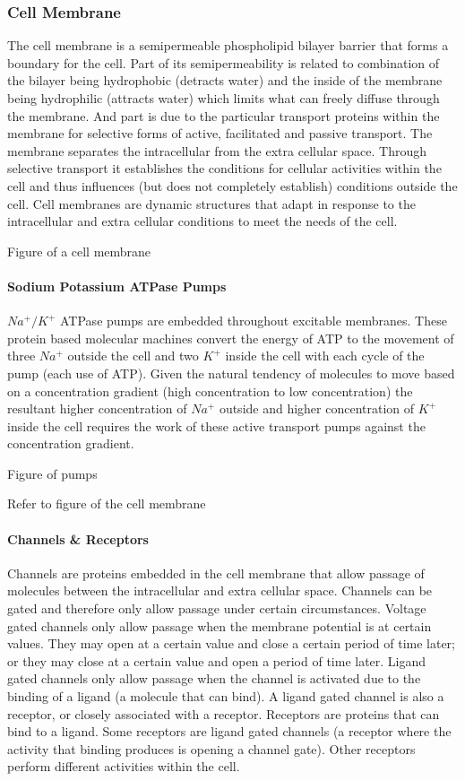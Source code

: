 \subsubsection{Cell Membrane}

The cell membrane is a semipermeable phospholipid bilayer barrier that forms a boundary for the cell. Part of its semipermeability is related to combination of the bilayer being hydrophobic (detracts water) and the inside of the membrane being hydrophilic (attracts water) which limits what can freely diffuse through the membrane. And part is due to the particular transport proteins within the membrane for selective forms of active, facilitated and passive transport. The membrane separates the intracellular from the extra cellular space. Through selective transport it establishes the conditions for cellular activities within the cell and thus influences (but does not completely establish) conditions outside the cell. Cell membranes are dynamic structures that adapt in response to the intracellular and extra cellular conditions to meet the needs of the cell.

Figure of a cell membrane

\paragraph{Sodium Potassium ATPase Pumps}
$Na^+/K^+$ ATPase pumps are embedded throughout excitable membranes. These protein based molecular machines convert the energy of ATP to the movement of three $Na^+$ outside the cell and two $K^+$ inside the cell with each cycle of the pump (each use of ATP). Given the natural tendency of molecules to move based on a concentration gradient (high concentration to low concentration) the resultant higher concentration of  $Na^+$ outside and higher concentration of $K^+$ inside the cell requires the work of these active transport pumps against the concentration gradient.

Figure of pumps

Refer to figure of the cell membrane 

\paragraph{Channels \& Receptors}
Channels are proteins embedded in the cell membrane that allow passage of molecules between the intracellular and extra cellular space. Channels can be gated and therefore only allow passage under certain circumstances. 
Voltage gated channels only allow passage when the membrane potential is at certain values. They may open at a certain value and close a certain period of time later; or they may close at a certain value and open a period of time later. 
Ligand gated channels only allow passage when the channel is activated due to the binding of a ligand (a molecule that can bind). A ligand gated channel is also a receptor, or closely associated with a receptor. 
Receptors are proteins that can bind to a ligand. Some receptors are ligand gated channels (a receptor where the activity that binding produces is opening a channel gate). Other receptors perform different activities within the cell. 

